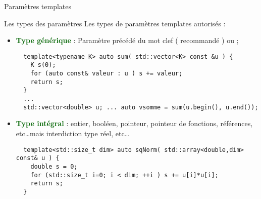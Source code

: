 \documentclass[compress,10pt,aspectratio=169]{beamer}
\begin{document}
\begin{frame}[fragile]{Paramètres templates}
    \scriptsize
    \begin{block}{\small Les types des paramètres}
    Les types de paramètres templates autorisés :
    \begin{itemize}
    \item  \textcolor{DarkGreen}{\textbf{Type générique}} : Paramètre précédé du mot clef \verb@typename@ ( recommandé ) 
           ou \verb@class@;
  \begin{verbatim}
  template<typename K> auto sum( std::vector<K> const &u ) {
    K s(0);
    for (auto const& valeur : u ) s += valeur;
    return s; 
  }
  ...
  std::vector<double> u; ... auto vsomme = sum(u.begin(), u.end());
  \end{verbatim}
    \item \textcolor{DarkGreen}{\textbf{Type intégral}} : entier, booléen, pointeur, pointeur de fonctions, références, 
          etc\ldots mais interdiction type réel, etc\ldots
  \begin{verbatim}
  template<std::size_t dim> auto sqNorm( std::array<double,dim> const& u ) {
    double s = 0; 
    for (std::size_t i=0; i < dim; ++i ) s += u[i]*u[i]; 
    return s; 
  }
  \end{verbatim}
  \end{itemize}
  \end{block}
  \end{frame}
  
\end{document}
